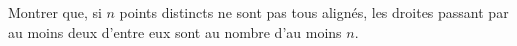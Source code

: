 Montrer que, si $n$ points distincts ne sont pas tous alignés, les droites passant par au moins deux d'entre eux sont au nombre d'au moins $n$.
